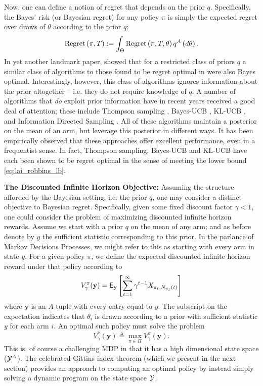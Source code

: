 Now, one can define a notion of regret that depends on the prior $q$. Specifically, the Bayes' risk (or Bayesian regret) for any policy $\pi$ is simply the expected regret over draws of $\theta$ according to the prior $q$:
\[
\textnormal{Regret} \left( \pi, T \right) := \int_\Theta \textnormal{Regret} \left( \pi, T, \theta \right) q^A\left(d\theta\right).
\]
In yet another landmark paper, \cite{lai1985asymptotically} showed that for a restricted class of priors $q$ a similar class of algorithms to those found to be regret optimal in \citep{lai1985asymptotically} were also Bayes optimal. Interestingly, however, this class of algorithms ignores information about the prior altogether -- i.e. they do not require knowledge of $q$. A number of algorithms that {\em do} exploit prior information have in recent years received a good deal of attention; these include Thompson sampling \citep{thompson1933likelihood}, Bayes-UCB \citep{kaufmann2012thompson}, KL-UCB \citep{garivier2011kl}, and Information Directed Sampling \citep{russo2014learning}. All of these algorithms maintain a posterior on the mean of an arm, but leverage this posterior in different ways. It has been empirically observed that these approaches offer excellent performance, even in a frequentist sense. In fact, Thompson sampling, Bayes-UCB and KL-UCB have each been shown to be regret optimal in the sense of meeting the lower bound  \eqref{eq:lai_robbins_lb}. 
 
\noindent\textbf{\textsf{The Discounted Infinite Horizon Objective: }}Assuming the structure afforded by the Bayesian setting, i.e. the prior $q$, one may consider a distinct objective to Bayesian regret. Specifically, given some fixed discount factor $\gamma < 1$, one could consider the problem of maximizing discounted infinite horizon rewards. Assume we start with a prior $q$ on the mean of any arm; and as before denote by $y$ the sufficient statistic corresponding to this prior. In the parlance of Markov Decisions Processes, we might refer to this as starting with every arm in state $y$. For a given policy $\pi$, we define the expected discounted infinite horizon reward under that policy according to
\[
V^\pi_\gamma(\mathbf{y}) 
=
\mathsf{E}_{\mathbf{y}}
\left[
	\sum_{t=1}^\infty \gamma^{t-1} X_{\pi_t,N_{\pi_t}(t)}
\right]
\]
where $\mathbf{y}$ is an $A$-tuple with every entry equal to $y$. The subscript on the expectation indicates that $\theta_i$ is drawn according to a prior with sufficient statistic $y$ for each arm $i$. An optimal such policy must solve the problem
\[
V^*_\gamma(\mathbf{y}) 
\triangleq 
\max_{\pi \in \Pi} V^\pi_\gamma(\mathbf{y}). 
\]
This is, of course a challenging MDP in that it has a high dimensional state space ($\mathcal Y^A$). The celebrated Gittins index theorem (which we present in the next section) provides an approach to computing an optimal policy by instead simply solving a dynamic program on the state space $\mathcal Y$. 


